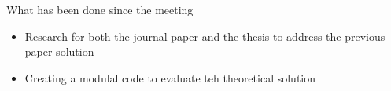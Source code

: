 \section{}
    \begin{frame}[allowframebreaks]{What has been done since the meeting}
        \begin{itemize}
            \item Research for both the journal paper and the thesis to address the previous paper solution
            \item Creating a modulal code to evaluate teh theoretical solution
        \end{itemize}
    \end{frame}
    
    \subsection{}
        
        